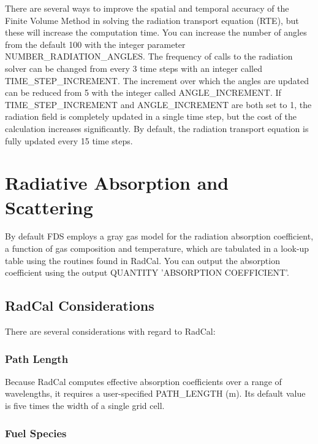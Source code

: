 \documentclass[11pt]{book}
\begin{document}
\label{info:RADI_Resolution}

There are several ways to improve the spatial and temporal accuracy of the Finite Volume
Method in solving the radiation transport equation (RTE), but these will
increase the computation time. You can increase the number
of angles from the default 100 with the integer parameter
{\ct NUMBER\_RADIATION\_ANGLES}. The frequency of calls to the radiation
solver can be changed from every 3 time steps with an integer called
{\ct TIME\_STEP\_INCREMENT}. The increment over which the angles are
updated can be reduced from 5 with the integer called {\ct ANGLE\_INCREMENT}.
If {\ct TIME\_STEP\_INCREMENT} and {\ct ANGLE\_INCREMENT} are
both set to 1, the radiation field is completely updated in a single
time step, but the cost of the calculation increases significantly. By default,
the radiation transport equation is fully updated every 15 time steps.



\section{Radiative Absorption and Scattering}
\label{info:RADI_RADCAL_Absorption}

By default FDS employs a gray gas model for the radiation absorption coefficient, a function
of gas composition and temperature, which are
tabulated in a look-up table using the routines found in RadCal. You can output the absorption coefficient using the output {\ct QUANTITY} {\ct 'ABSORPTION COEFFICIENT'}.

\subsection{RadCal Considerations}

\label{info:RadCal}

There are several considerations with regard to RadCal:

\subsubsection{Path Length}

Because RadCal computes effective absorption coefficients over a range of wavelengths, it requires a user-specified {\ct PATH\_LENGTH} (m).
Its default value is five times the width of a single grid cell.

\subsubsection{Fuel Species}
\end{document}
